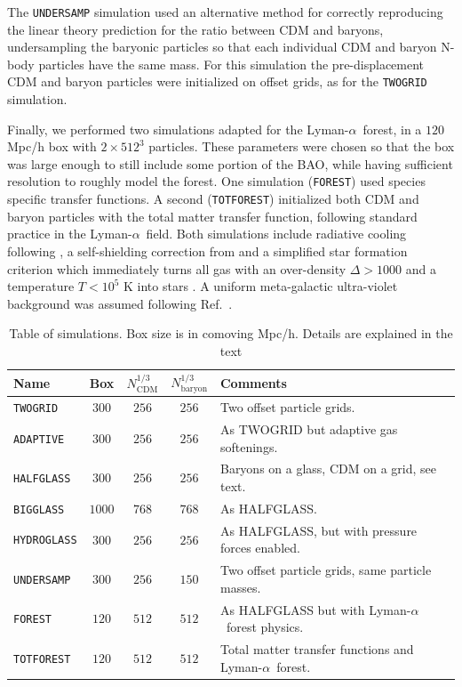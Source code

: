 \documentclass[a4paper,11pt]{article}
\newcommand{\Lya}{Lyman-$\alpha$}
\begin{document}
The \texttt{UNDERSAMP} simulation used an alternative method for correctly reproducing the linear theory prediction for the ratio between CDM and baryons, undersampling the baryonic particles so that each individual CDM and baryon N-body particles have the same mass. For this simulation the pre-displacement CDM and baryon particles were initialized on offset grids, as for the \texttt{TWOGRID} simulation.

Finally, we performed two simulations adapted for the \Lya~forest, in a $120$ Mpc/h box with $2\times 512^3$ particles. These parameters were chosen so that the box was large enough to still include some portion of the BAO, while having sufficient resolution to roughly model the forest. One simulation (\texttt{FOREST}) used species specific transfer functions. A second (\texttt{TOTFOREST}) initialized both CDM and baryon particles with the total matter transfer function, following standard practice in the \Lya~field. Both simulations include radiative cooling following \cite{Katz:1996}, a self-shielding correction from \cite{Rahmati:2013} and a simplified star formation criterion which immediately turns all gas with an over-density $\Delta > 1000$ and a temperature $T < 10^5$ K into stars \cite{Viel:2004}. A uniform meta-galactic ultra-violet background was assumed following Ref.~\cite{Puchwein:2018}.

\begin{table}
\begin{center}
\begin{tabular}{|l|c|c|c|l|}
\hline
Name & Box & $N_\mathrm{CDM}^{1/3}$ & $N_\mathrm{baryon}^{1/3}$ & Comments  \\
\hline
\texttt{TWOGRID}    &   $300$ & $256$ & $256$ & Two offset particle grids. \\
\texttt{ADAPTIVE}    &   $300$ & $256$ & $256$ & As TWOGRID but adaptive gas softenings. \\
\texttt{HALFGLASS}  &   $300$ & $256$ & $256$ & Baryons on a glass, CDM on a grid, see text. \\
\texttt{BIGGLASS}  &   $1000$ & $768$ & $768$ & As HALFGLASS. \\
\texttt{HYDROGLASS}  &   $300$ & $256$ & $256$ & As HALFGLASS, but with pressure forces enabled. \\
\texttt{UNDERSAMP}  &   $300$ & $256$ & $150$ & Two offset particle grids, same particle masses. \\
\texttt{FOREST}  &   $120$ & $512$ & $512$ & As HALFGLASS but with \Lya~forest physics. \\
\texttt{TOTFOREST}  &   $120$ & $512$ & $512$ & Total matter transfer functions and \Lya~forest. \\
\hline
\end{tabular}
\end{center}
\caption{Table of simulations. Box size is in comoving Mpc/h. Details are explained in the text}
\label{tab:simulations}
\end{table}
\end{document}
